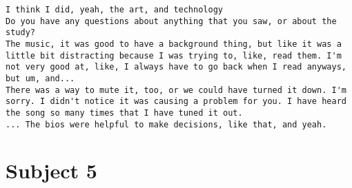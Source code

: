 \begin{lstlisting}
I think I did, yeah, the art, and technology
Do you have any questions about anything that you saw, or about the study?
The music, it was good to have a background thing, but like it was a little bit distracting because I was trying to, like, read them. I'm not very good at, like, I always have to go back when I read anyways, but um, and...
There was a way to mute it, too, or we could have turned it down. I'm sorry. I didn't notice it was causing a problem for you. I have heard the song so many times that I have tuned it out.
... The bios were helpful to make decisions, like that, and yeah.
\end{lstlisting}

\clearpage\section*{Subject 5}
